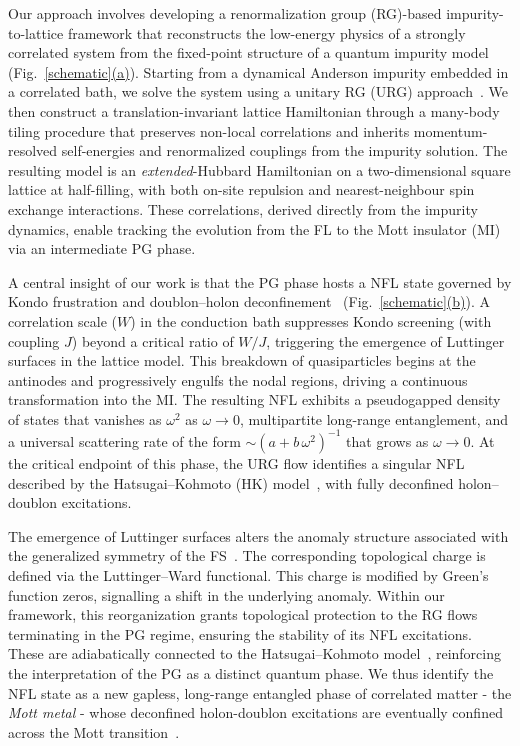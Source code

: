 Our approach involves developing a renormalization group (RG)-based impurity-to-lattice framework that reconstructs the low-energy physics of a strongly correlated system from the fixed-point structure of a quantum impurity model (Fig.~\hyperref[schematic]{\ref*{schematic}(a)}). Starting from a dynamical Anderson impurity embedded in a correlated bath, we solve the system using a unitary RG (URG) approach~\cite{anirbanurg1,anirbanurg2}. We then construct a translation-invariant lattice Hamiltonian through a many-body tiling procedure that preserves non-local correlations and inherits momentum-resolved self-energies and renormalized couplings from the impurity solution. The resulting model is an \textit{extended}-Hubbard Hamiltonian on a two-dimensional square lattice at half-filling, with both on-site repulsion and nearest-neighbour spin exchange interactions. These correlations, derived directly from the impurity dynamics, enable tracking the evolution from the FL to the Mott insulator (MI) via an intermediate PG phase.

A central insight of our work is that the PG phase hosts a NFL state governed by Kondo frustration and doublon–holon deconfinement~\cite{keimer2015quantum} (Fig.~\hyperref[schematic]{\ref*{schematic}(b)}). A correlation scale ($W$) in the conduction bath suppresses Kondo screening (with coupling $J$) beyond a critical ratio of $W/J$, triggering the emergence of Luttinger surfaces in the lattice model. This breakdown of quasiparticles begins at the antinodes and progressively engulfs the nodal regions, driving a continuous transformation into the MI. The resulting NFL exhibits a pseudogapped density of states that vanishes as $\omega^{2}$ as $\omega \to 0$, multipartite long-range entanglement, and a universal scattering rate of the form $\sim (a + b\,\omega^2)^{-1}$ that grows as $\omega \to 0$. At the critical endpoint of this phase, the URG flow identifies a singular NFL described by the Hatsugai–Kohmoto (HK) model~\cite{Hatsugai1992,Baskaran1991,Huang2022}, with fully deconfined holon–doublon excitations.

The emergence of Luttinger surfaces alters the anomaly structure associated with the generalized symmetry of the FS~\cite{Altshuler_1998,Heath_2020,lanave2025}. The corresponding topological charge is defined via the Luttinger–Ward functional. This charge is modified by Green’s function zeros, signalling a shift in the underlying anomaly. Within our framework, this reorganization grants topological protection to the RG flows terminating in the PG regime, ensuring the stability of its NFL excitations. These are adiabatically connected to the Hatsugai–Kohmoto model~\cite{Hatsugai1992,Baskaran1991}, reinforcing the interpretation of the PG as a distinct quantum phase. We thus identify the NFL state as a new gapless, long-range entangled phase of correlated matter - the \textit{Mott metal} - whose deconfined holon-doublon excitations are eventually confined across the Mott transition~\cite{Mott_1949}.

